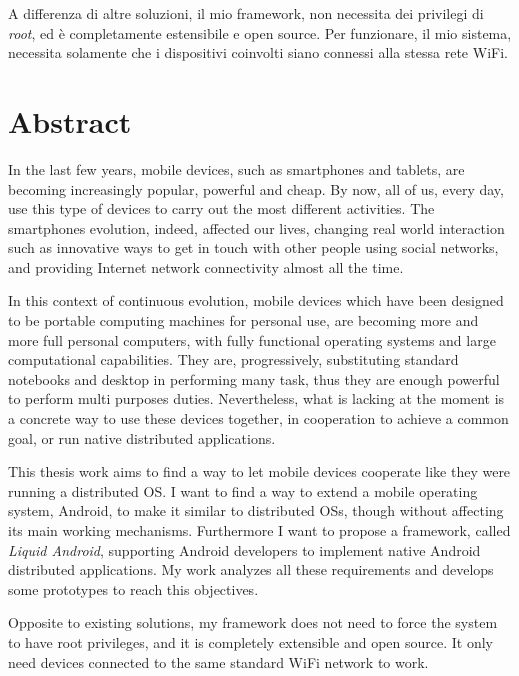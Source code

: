 \par A differenza di altre soluzioni, il mio framework, non necessita dei privilegi di \textit{root}, ed è completamente estensibile e open source. Per funzionare, il mio sistema, necessita solamente che i dispositivi coinvolti siano connessi alla stessa rete WiFi.
%
\cleardoublepage
%
%
%
%
\chapter*{Abstract}
\par In the last few years, mobile devices, such as smartphones and tablets, are becoming increasingly popular, powerful and cheap.
By now, all of us, every day, use this type of devices to carry out the most different activities. The smartphones evolution, indeed, affected our lives, changing real world interaction such as innovative ways to get in touch with other people using social networks, and providing Internet network connectivity almost all the time.\\
\par In this context of continuous evolution, mobile devices which have been designed to be portable computing machines for personal use, are becoming more and more full personal computers, with fully functional operating systems and large computational capabilities. They are, progressively, substituting standard notebooks and desktop in performing many task, thus they are enough powerful to perform multi purposes duties. Nevertheless, what is lacking at the moment is a concrete way to use these devices together, in cooperation to achieve a common goal, or run native distributed applications.\\
\par This thesis work aims to find a way to let mobile devices cooperate like they were running a distributed OS. I want to find a way to extend a mobile operating system, Android, to make it similar to distributed OSs, though without affecting its main working mechanisms. Furthermore I want to propose a framework, called \textit{Liquid Android}, supporting Android developers to implement native Android distributed applications.  My work analyzes all these requirements and develops some prototypes to reach this objectives.\\
\par Opposite to existing solutions, my framework does not need to force the system to have root privileges, and it is completely extensible and open source. It only need devices connected to the same standard WiFi network to work.


\medskip
%

